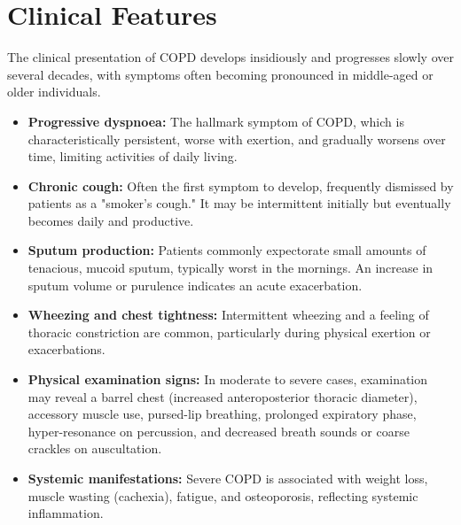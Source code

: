 \section*{Clinical Features}
The clinical presentation of COPD develops insidiously and progresses slowly over several decades, with symptoms often becoming pronounced in middle-aged or older individuals.
\begin{itemize}
    \item \textbf{Progressive dyspnoea:} The hallmark symptom of COPD, which is characteristically persistent, worse with exertion, and gradually worsens over time, limiting activities of daily living.
    \item \textbf{Chronic cough:} Often the first symptom to develop, frequently dismissed by patients as a "smoker's cough." It may be intermittent initially but eventually becomes daily and productive.
    \item \textbf{Sputum production:} Patients commonly expectorate small amounts of tenacious, mucoid sputum, typically worst in the mornings. An increase in sputum volume or purulence indicates an acute exacerbation.
    \item \textbf{Wheezing and chest tightness:} Intermittent wheezing and a feeling of thoracic constriction are common, particularly during physical exertion or exacerbations.
    \item \textbf{Physical examination signs:} In moderate to severe cases, examination may reveal a barrel chest (increased anteroposterior thoracic diameter), accessory muscle use, pursed-lip breathing, prolonged expiratory phase, hyper-resonance on percussion, and decreased breath sounds or coarse crackles on auscultation.
    \item \textbf{Systemic manifestations:} Severe COPD is associated with weight loss, muscle wasting (cachexia), fatigue, and osteoporosis, reflecting systemic inflammation.
\end{itemize}

